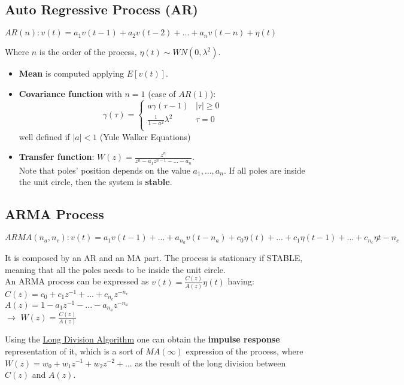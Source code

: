 \documentclass[10pt,a4paper]{article}
\begin{document}
\subsection{Auto Regressive Process (AR)}
\center 
$AR(n) : v(t) = a_1v(t-1)+a_2v(t-2)+...+a_nv(t-n) + \eta(t)$
\\
\vspace{0.5em}
\raggedright
Where $n$ is the order of the process, $\eta(t) \sim WN(0,\lambda^2)$. \\
\begin{itemize}
	\item \textbf{Mean} is computed applying $E[v(t)]$.
	\item \textbf{Covariance function} with $n=1$ (case of $AR(1)$):
	\begin{equation}
  		\gamma(\tau) =
    		\begin{cases}
      			a\gamma(\tau-1) & |\tau| \geq 0\\
      			\frac{1}{1-a^2} \lambda^2 & \tau=0\\
    \end{cases}       
\end{equation}
	well defined if $|a|<1$ (Yule Walker Equations)
	\item \textbf{Transfer function}: $W(z)=\frac{z^n}{z^n-a_1z^{n-1}-...-a_n}$. \\
	\vspace{0.5em}
	Note that poles' position depends on the value $a_1, ..., a_n$. If all poles are inside the unit circle, then the system is \textbf{stable}.
\end{itemize}
\subsection{ARMA Process}
\center 
$ARMA(n_a,n_c) : v(t) = a_1v(t-1)+...+a_{n_a}v(t-n_a) + c_0\eta(t) + ... + c_1\eta(t-1) + ... + c_{n_c}\eta{t-n_c}$
\\
\vspace{1em}
\raggedright
It is composed by an AR and an MA part. The process is stationary if STABLE, meaning that all the poles needs to be inside the unit circle. \\
An ARMA process can be expressed as $v(t)=\frac{C(z)}{A(z)}\eta(t)$ having:
\center
 $C(z)=c_0+c_1z^{-1}+...+c_{n_c}z^{-n_c}$\\ $A(z)=1-a_1z^{-1}-...-a_{n_a}z^{-n_a}$
 \\
$\rightarrow$ $W(z) = \frac{C(z)}{A(z)}$
\\ \raggedright \vspace{0.5em}
Using the \uline{Long Division Algorithm} one can obtain the \textbf{impulse response} representation of it, which is a sort of $MA(\infty)$ expression of the process, where $W(z)=w_0+w_1z^{-1}+w_2z^{-2}+...$ as the result of the long division between $C(z)$ and $A(z)$.
\pagebreak
\end{document}
